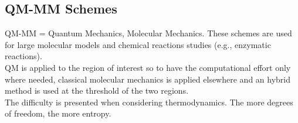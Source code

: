 \subsection{QM-MM Schemes}
QM-MM = Quantum Mechanics, Molecular Mechanics. These schemes are used for large molecular models and chemical reactions studies (e.g., enzymatic reactions).\\
QM is applied to the region of interest so to have the computational effort only where needed, classical molecular mechanics is applied elsewhere and an hybrid method is used at the threshold of the two regions.\\
The difficulty is presented when considering thermodynamics. The more degrees of freedom, the more entropy.\\
